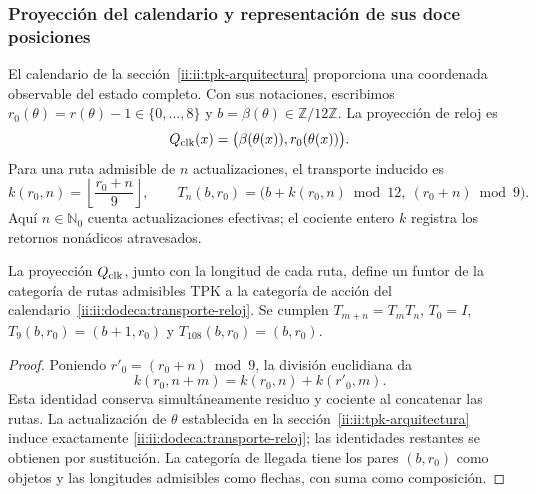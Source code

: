 \subsubsection{Proyección del calendario y representación de sus doce posiciones}
\label{ii:ii:dodeca:calendario}
El calendario de la sección~\ref{ii:ii:tpk-arquitectura} proporciona una
coordenada observable del estado completo. Con sus notaciones, escribimos
\(r_0(\theta)=r(\theta)-1\in\{0,\ldots,8\}\) y
\(b=\beta(\theta)\in\mathbb Z/12\mathbb Z\). La proyección de reloj es
\[
 Q_{\rm clk}(x)=\bigl(\beta(\theta(x)),r_0(\theta(x))\bigr).
\]
Para una ruta admisible de \(n\) actualizaciones, el transporte inducido es
\begin{equation}
 k(r_0,n)=\left\lfloor\frac{r_0+n}{9}\right\rfloor,
 \qquad
 T_n(b,r_0)=\bigl(b+k(r_0,n)\bmod12,\ (r_0+n)\bmod9\bigr).
 \label{ii:ii:dodeca:transporte-reloj}
\end{equation}
Aquí \(n\in\mathbb N_0\) cuenta actualizaciones efectivas; el cociente
entero \(k\) registra los retornos nonádicos atravesados.

\begin{proposition}
\label{ii:ii:dodeca:composicion}
La proyección \(Q_{\rm clk}\), junto con la longitud de cada ruta, define
un funtor de la categoría de rutas admisibles TPK a la categoría de acción
del calendario~\eqref{ii:ii:dodeca:transporte-reloj}. Se cumplen
\(T_{m+n}=T_mT_n\), \(T_0=I\),
\(T_9(b,r_0)=(b+1,r_0)\) y \(T_{108}(b,r_0)=(b,r_0)\).
\end{proposition}
\begin{proof}
Poniendo \(r'_0=(r_0+n)\bmod9\), la división euclidiana da
\[
 k(r_0,n+m)=k(r_0,n)+k(r'_0,m).
\]
Esta identidad conserva simultáneamente residuo y cociente al concatenar
las rutas. La actualización de \(\theta\) establecida en la
sección~\ref{ii:ii:tpk-arquitectura} induce exactamente
\eqref{ii:ii:dodeca:transporte-reloj}; las identidades restantes se obtienen
por sustitución. La categoría de llegada tiene los pares \((b,r_0)\) como
objetos y las longitudes admisibles como flechas, con suma como composición.
\end{proof}

